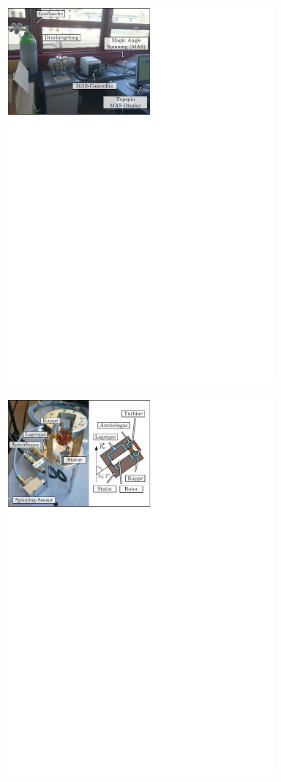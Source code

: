 \documentclass[a4paper]{article}
\newenvironment{Figure}
	{\par\medskip\noindent\minipage{\linewidth}}
	{\endminipage\par\medskip}
\begin{document}
\begin{multicols*}{2}
				\setlength{\parindent}{0mm}
				\setlength{\parskip}{0mm}
				
				\begin{Figure}
					\centering
					\includegraphics[trim={0cm 21.2cm 9.7cm 0},clip,width=7cm]{images/Device_2.pdf}
					\label{fig:device2}
				\end{Figure}
				
				\begin{Figure}
					\centering
					\includegraphics[trim={0cm 21.2cm 9.7cm 0},clip,width=7cm]{images/Device_3.pdf}
					\label{fig:device3}
				\end{Figure}
		
	\end{multicols*}
\end{document}
